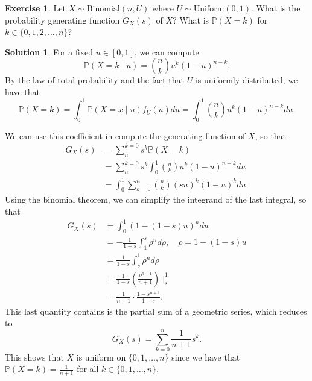 \documentclass[12pt]{article}
\newcommand{\Prob}{\mathbb{P}}
\theoremstyle{definition}
\newtheorem{exer}{Exercise}
\newtheorem{sol}{Solution}
\theoremstyle{remark}
\begin{document}
\begin{exer}
    Let $X \sim \text{Binomial}(n, U)$ where $U\sim \text{Uniform}(0,1)$. What is the probability generating function $G_{X}(s)$ of $X$? What is $\Prob(X = k)$ for  $k\in \{0, 1, 2, \ldots, n\}$?
\end{exer}

  \begin{sol}
    For a fixed $u\in [0,1]$, we can compute 
    \begin{equation*}
        \Prob(X = k  \mid u) = \binom{n}{k} u^{k}(1-u)^{n-k}.
    \end{equation*}
    By the law of total probability and the fact that $U$ is uniformly distributed, we have that 
    \begin{equation*}
        \Prob(X = k) = \int_{0}^{1} \Prob(X = x \mid u) f_{U}(u) du = \int_{0}^{1} \binom{n}{k} u^{k}(1-u)^{n-k} du.
    \end{equation*}

    We can use this coefficient in compute the generating function of $X$, so that
    \begin{align*}
        G_{X}(s) &= \sum^{k=0}_{n} s^{k} \Prob(X=k) \\
                 &= \sum^{k=0}_{n} s^{k} \int_{0}^{1} \binom{n}{k} u^{k}(1-u)^{n-k} du \\
                 &= \int_{0}^{1}\sum_{k=0}^{n} \binom{n}{k} (su)^{k}(1-u)^{k} du.
    \end{align*}
    Using the binomial theorem, we can simplify the integrand of the last integral, so that 
    \begin{align*}
        G_{X}(s) &= \int_{0}^{1}(1 - (1-s)u)^n du\\
                 &= -\frac{1}{1-s} \int_{1}^{s} \rho^{n}d\rho, \quad \rho = 1- (1-s)u\\
                 &= \frac{1}{1-s} \int_{s}^{1} \rho^{n}d\rho\\
                 &= \frac{1}{1-s} \left(\frac{\rho^{n+1}}{n+1}\right)  \mid_{s}^{1}\\
                 &= \frac{1}{n+1} \cdot \frac{1-s^{n+1}}{1-s}.  
    \end{align*}
    This last quantity contains is the partial sum of a geometric series, which reduces to
    \begin{equation*}
        G_{X}(s) = \sum_{k = 0}^{n} \frac{1}{n+1} s^{k}.
    \end{equation*}
    This shows that $X$ is uniform on $\{0, 1, \ldots, n\}$ since we have that $\Prob(X=k) =  \frac{1}{n+1}$ for all $k\in  \{0, 1, \ldots, n\}$.
  \end{sol}
\end{document}
